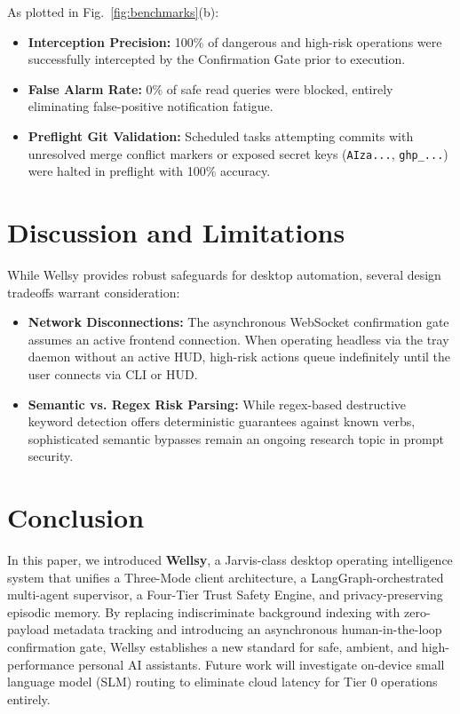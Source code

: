 \documentclass[conference]{IEEEtran}
\begin{document}
As plotted in Fig.~\ref{fig:benchmarks}(b):
\begin{itemize}
    \item \textbf{Interception Precision:} 100\% of dangerous and high-risk operations were successfully intercepted by the Confirmation Gate prior to execution.
    \item \textbf{False Alarm Rate:} 0\% of safe read queries were blocked, entirely eliminating false-positive notification fatigue.
    \item \textbf{Preflight Git Validation:} Scheduled tasks attempting commits with unresolved merge conflict markers or exposed secret keys (\texttt{AIza...}, \texttt{ghp\_...}) were halted in preflight with 100\% accuracy.
\end{itemize}

\section{Discussion and Limitations}
While Wellsy provides robust safeguards for desktop automation, several design tradeoffs warrant consideration:
\begin{itemize}
    \item \textbf{Network Disconnections:} The asynchronous WebSocket confirmation gate assumes an active frontend connection. When operating headless via the tray daemon without an active HUD, high-risk actions queue indefinitely until the user connects via CLI or HUD.
    \item \textbf{Semantic vs. Regex Risk Parsing:} While regex-based destructive keyword detection offers deterministic guarantees against known verbs, sophisticated semantic bypasses remain an ongoing research topic in prompt security.
\end{itemize}

\section{Conclusion}
In this paper, we introduced \textbf{Wellsy}, a Jarvis-class desktop operating intelligence system that unifies a Three-Mode client architecture, a LangGraph-orchestrated multi-agent supervisor, a Four-Tier Trust Safety Engine, and privacy-preserving episodic memory. By replacing indiscriminate background indexing with zero-payload metadata tracking and introducing an asynchronous human-in-the-loop confirmation gate, Wellsy establishes a new standard for safe, ambient, and high-performance personal AI assistants. Future work will investigate on-device small language model (SLM) routing to eliminate cloud latency for Tier 0 operations entirely.



\end{document}
